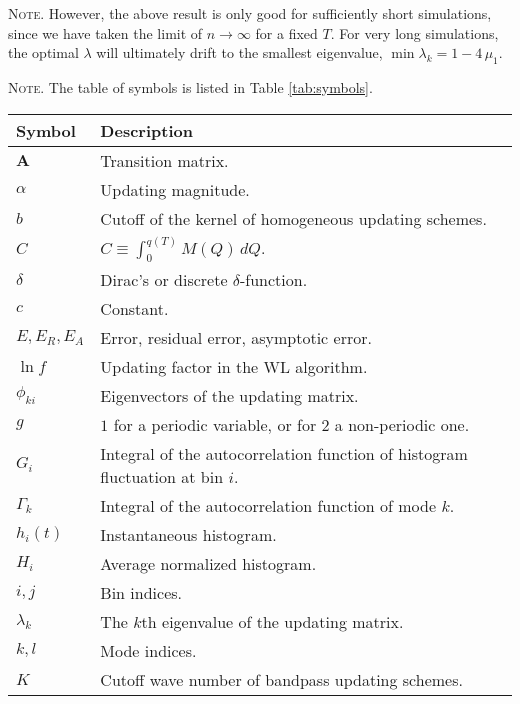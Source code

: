 \documentclass[reprint, superscriptaddress, floatfix]{revtex4-1}
\newcommand{\note}[1]{{\color{DarkGreen}\footnotesize \textsc{Note.} #1}}
\newcommand{\Err}{E}
\begin{document}
\note{
However, the above result %
is only good
for sufficiently short simulations,
since we have taken the limit of $n \to \infty$
for a fixed $T$.
%
For very long simulations,
the optimal $\lambda$
will ultimately drift to
the smallest eigenvalue,
$\min \lambda_k = 1 - 4 \, \mu_1$.
}


\note{The table of symbols is listed in Table \ref{tab:symbols}.
  \begin{table*}
  \footnotesize
  \centering
  \rowcolors{1}{white}{LightGray}
  \setlength{\tabcolsep}{4pt} %
  \caption{\label{tab:symbols}
    Table of symbols.}
  \begin{tabular}{l | p{12cm} }
    Symbol          &   Description \\
    \hline
    $\mathbf{A}$    &   Transition matrix. \\
    $\alpha$        &   Updating magnitude. \\
    $b$             &   Cutoff of the kernel of homogeneous updating schemes. \\
    $C$             &   $C \equiv \int_0^{ q(T) } M(Q) \, dQ$.  \\
    $\delta$        &   Dirac's or discrete $\delta$-function. \\
    $c$             &   Constant. \\
    $\Err, \Err_R, \Err_A$          &   Error, residual error, asymptotic error. \\
    $\ln f$         &   Updating factor in the WL algorithm.  \\
    $\phi_{ki}$     &   Eigenvectors of the updating matrix. \\
    $g$             &   $1$ for a periodic variable, or for $2$ a non-periodic one. \\
    $G_i$           &   Integral of the autocorrelation function of histogram fluctuation at bin $i$. \\
    $\Gamma_k$      &   Integral of the autocorrelation function of mode $k$. \\
    $h_i(t)$        &   Instantaneous histogram.  \\
    $H_i$           &   Average normalized histogram.  \\
    $i, j$          &   Bin indices. \\
    $\lambda_k$     &   The $k$th eigenvalue of the updating matrix. \\
    $k, l$          &   Mode indices. \\
    $K$             &   Cutoff wave number of bandpass updating schemes.  \\

\end{tabular}
\end{table*}}
\end{document}

